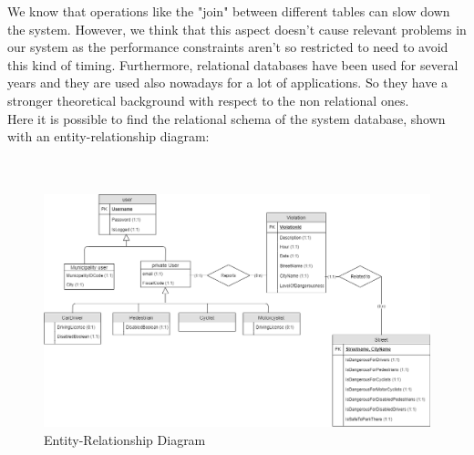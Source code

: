 \documentclass[titlepage]{article}
\begin{document}
\begin{itemize}
We know that operations like the "join" between different tables can slow down the system. However, we think that this aspect doesn't cause relevant problems in our system as the performance constraints aren't so restricted to need to avoid this kind of timing. Furthermore, relational databases have been used for several years and they are used also nowadays for a lot of applications. So they have a stronger theoretical background with respect to the non relational ones.\\

\newpage
Here it is possible to find the relational schema of the system database, shown with an entity-relationship diagram: \\ \\ \\


\begin{figure}[h]
	\includegraphics[scale=0.43]{Diagrams/ER diagram.png}
	\caption{Entity-Relationship Diagram}
\end{figure}
\FloatBarrier

	
\end{itemize}
\end{document}
